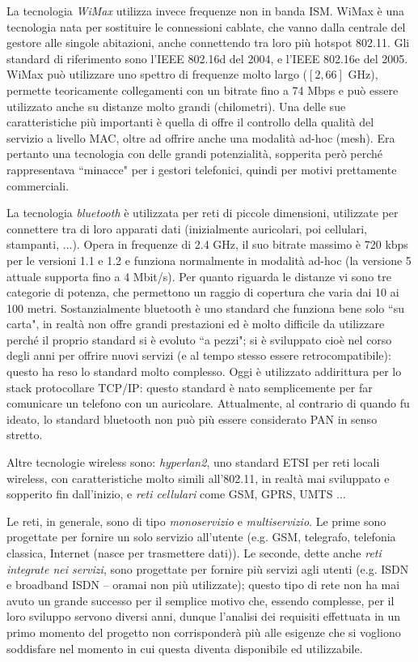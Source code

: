 La tecnologia \textit{WiMax} utilizza invece frequenze non in banda ISM. WiMax è una tecnologia nata per sostituire le connessioni cablate, che vanno dalla centrale del gestore alle singole abitazioni, anche connettendo tra loro più hotspot 802.11. Gli standard di riferimento sono l'IEEE 802.16d del 2004, e l'IEEE 802.16e del 2005. WiMax può utilizzare uno spettro di frequenze molto largo ($[2, 66]$ GHz), permette teoricamente collegamenti con un bitrate fino a 74 Mbps e può essere utilizzato anche su distanze molto grandi (chilometri). Una delle sue caratteristiche più importanti è quella di offre il controllo della qualità del servizio a livello MAC, oltre ad offrire anche una modalità ad-hoc (mesh). Era pertanto una tecnologia con delle grandi potenzialità, sopperita però perché rappresentava \textquotedblleft minacce" per i gestori telefonici, quindi per motivi prettamente commerciali.

La tecnologia \textit{bluetooth} è utilizzata per reti di piccole dimensioni, utilizzate per connettere tra di loro apparati dati (inizialmente auricolari, poi cellulari, stampanti, $\dots$). Opera in frequenze di 2.4 GHz, il suo bitrate massimo è 720 kbps per le versioni 1.1 e 1.2 e funziona normalmente in modalità ad-hoc (la versione 5 attuale supporta fino a 4 Mbit/s). Per quanto riguarda le distanze vi sono tre categorie di potenza, che permettono un raggio di copertura che varia dai 10 ai 100 metri. Sostanzialmente bluetooth è uno standard che funziona bene solo \textquotedblleft su carta", in realtà non offre grandi prestazioni ed è molto difficile da utilizzare perché il proprio standard si è evoluto \textquotedblleft a pezzi"; si è sviluppato cioè nel corso degli anni per offrire nuovi servizi (e al tempo stesso essere retrocompatibile): questo ha reso lo standard molto complesso. Oggi è utilizzato addirittura per lo stack protocollare TCP/IP: questo standard è nato semplicemente per far comunicare un telefono con un auricolare. Attualmente, al contrario di quando fu ideato, lo standard bluetooth non può più essere considerato PAN in senso stretto.

Altre tecnologie wireless sono: \textit{hyperlan2}, uno standard ETSI per reti locali wireless, con caratteristiche molto simili all'802.11, in realtà mai sviluppato e sopperito fin dall'inizio, e \textit{reti cellulari} come GSM, GPRS, UMTS $\dots$

Le reti, in generale, sono di tipo \textit{monoservizio} e \textit{multiservizio}. Le prime sono progettate per fornire un solo servizio all'utente (e.g. GSM, telegrafo, telefonia classica, Internet (nasce per trasmettere dati)). Le seconde, dette anche \textit{reti integrate nei servizi}, sono progettate per fornire più servizi agli utenti (e.g. ISDN e broadband ISDN -- oramai non più utilizzate); questo tipo di rete non ha mai avuto un grande successo per il semplice motivo che, essendo complesse, per il loro sviluppo servono diversi anni, dunque l'analisi dei requisiti effettuata in un primo momento del progetto non corrisponderà più alle esigenze che si vogliono soddisfare nel momento in cui questa diventa disponibile ed utilizzabile.


